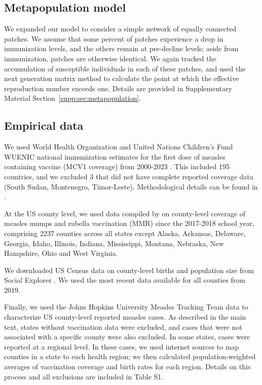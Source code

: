 \subsection{Metapopulation model}
\label{sec:methods-metapopulation}

We expanded our model to consider a simple network of equally connected patches. We assume that some percent of patches experience a drop in immunization levels, and the others remain at pre-decline levels; aside from immunization, patches are otherwise identical. We again tracked the accumulation of susceptible individuals in each of these patches, and used the next generation matrix method to calculate the point at which the effective reproduction number exceeds one. Details are provided in Supplementary Material Section~\ref{supp:sec:metapopulation}.

\subsection{Empirical data}
\label{sec:methods-empirical}

We used World Health Organization and United Nations Children's Fund WUENIC national immunization estimates for the first dose of measles containing vaccine (MCV1 coverage) from 2000-2023 \citep{WHO_UNICEF2024}. This included 195 countries, and we excluded 3 that did not have complete reported coverage data (South Sudan, Montenegro, Timor-Leste). Methodological details can be found in \citep{BurtonEtAl2009}.

At the US county level, we used data compiled by \citep{DongEtAl2025} on county-level coverage of measles mumps and rubella vaccination (MMR) since the 2017-2018 school year, comprising 2237 counties across all states except Alaska, Arkansas, Delaware, Georgia, Idaho, Illinois, Indiana, Mississippi, Montana, Nebraska, New Hampshire, Ohio and West Virginia.

We downloaded US Census data on county-level births and population size from Social Explorer \citep{SocialExplorer2019}. We used the most recent data available for all counties from 2019.

Finally, we used the Johns Hopkins University Measles Tracking Team data \citep{JHUMeaslesTracking2026} to characterize US county-level reported measles cases. As described in the main text, states without vaccination data were excluded, and cases that were not associated with a specific county were also excluded. In some states, cases were reported at a regional level. In these cases, we used internet sources to map counties in a state to each health region; we then calculated population-weighted averages of vaccination coverage and birth rates for each region. Details on this process and all exclusions are included in Table S1.

